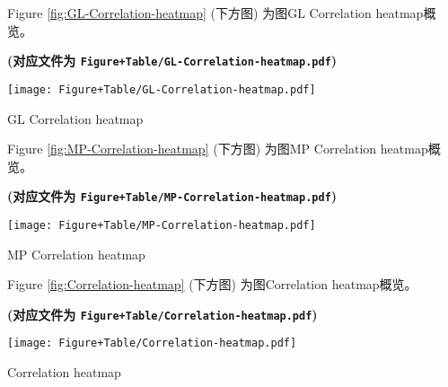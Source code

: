 \documentclass[
]{article}
\begin{document}
Figure \ref{fig:GL-Correlation-heatmap} (下方图) 为图GL Correlation heatmap概览。

\textbf{(对应文件为 \texttt{Figure+Table/GL-Correlation-heatmap.pdf})}

\def\@captype{figure}
\begin{center}
\texttt{[image: Figure+Table/GL-Correlation-heatmap.pdf]}
\caption{GL Correlation heatmap}\label{fig:GL-Correlation-heatmap}
\end{center}

\begin{center}\vspace{1.5cm}\end{center}

\begin{center}\vspace{1.5cm}\end{center}

Figure \ref{fig:MP-Correlation-heatmap} (下方图) 为图MP Correlation heatmap概览。

\textbf{(对应文件为 \texttt{Figure+Table/MP-Correlation-heatmap.pdf})}

\def\@captype{figure}
\begin{center}
\texttt{[image: Figure+Table/MP-Correlation-heatmap.pdf]}
\caption{MP Correlation heatmap}\label{fig:MP-Correlation-heatmap}
\end{center}

\begin{center}\vspace{1.5cm}\end{center}

\begin{center}\vspace{1.5cm}\end{center}

Figure \ref{fig:Correlation-heatmap} (下方图) 为图Correlation heatmap概览。

\textbf{(对应文件为 \texttt{Figure+Table/Correlation-heatmap.pdf})}

\def\@captype{figure}
\begin{center}
\texttt{[image: Figure+Table/Correlation-heatmap.pdf]}
\caption{Correlation heatmap}\label{fig:Correlation-heatmap}
\end{center}
\end{document}
